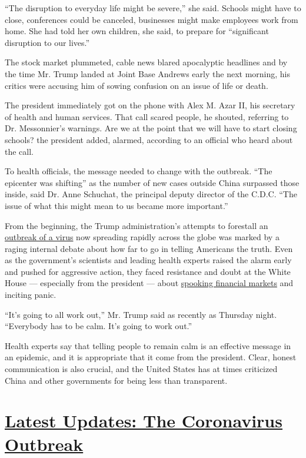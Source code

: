 ``The disruption to everyday life might be severe,'' she said. Schools
might have to close, conferences could be canceled, businesses might
make employees work from home. She had told her own children, she said,
to prepare for ``significant disruption to our lives.''

The stock market plummeted, cable news blared apocalyptic headlines and
by the time Mr. Trump landed at Joint Base Andrews early the next
morning, his critics were accusing him of sowing confusion on an issue
of life or death.

The president immediately got on the phone with Alex M. Azar II, his
secretary of health and human services. That call scared people, he
shouted, referring to Dr. Messonnier's warnings. Are we at the point
that we will have to start closing schools? the president added,
alarmed, according to an official who heard about the call.

To health officials, the message needed to change with the outbreak.
``The epicenter was shifting'' as the number of new cases outside China
surpassed those inside, said Dr. Anne Schuchat, the principal deputy
director of the C.D.C. ``The issue of what this might mean to us became
more important.''

From the beginning, the Trump administration's attempts to forestall an
\href{https://www.nytimes3xbfgragh.onion/2020/03/07/us/coronavirus-cpac.html}{outbreak
of a virus} now spreading rapidly across the globe was marked by a
raging internal debate about how far to go in telling Americans the
truth. Even as the government's scientists and leading health experts
raised the alarm early and pushed for aggressive action, they faced
resistance and doubt at the White House --- especially from the
president --- about
\href{https://www.nytimes3xbfgragh.onion/2020/03/01/business/economy/trump-democrats-coronavirus-economy.html}{spooking
financial markets} and inciting panic.

``It's going to all work out,'' Mr. Trump said as recently as Thursday
night. ``Everybody has to be calm. It's going to work out.''

Health experts say that telling people to remain calm is an effective
message in an epidemic, and it is appropriate that it come from the
president. Clear, honest communication is also crucial, and the United
States has at times criticized China and other governments for being
less than transparent.

\hypertarget{latest-updates-the-coronavirus-outbreak}{%
\section{\texorpdfstring{\href{https://www.nytimes3xbfgragh.onion/2020/09/09/world/covid-19-coronavirus.html?action=click\&pgtype=Article\&state=default\&region=MAIN_CONTENT_1\&context=storylines_live_updates}{Latest
Updates: The Coronavirus
Outbreak}}{Latest Updates: The Coronavirus Outbreak}}\label{latest-updates-the-coronavirus-outbreak}}

